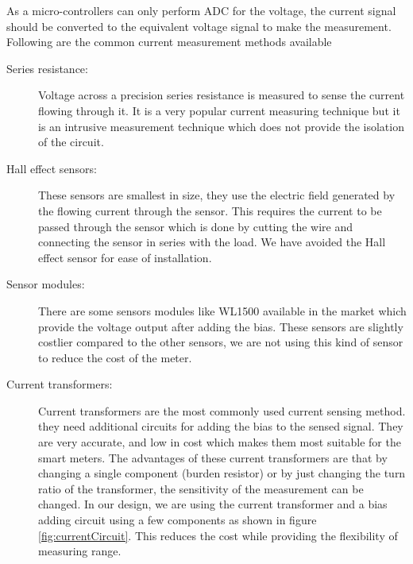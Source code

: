 As a micro-controllers can only perform ADC for the voltage, the current signal should be converted to the equivalent voltage signal to make the measurement. Following are the common current measurement methods available

\begin{description}
\item [Series resistance:] Voltage across a precision series resistance is measured to sense the current flowing through it. It is a very popular current measuring technique but it is an intrusive measurement technique which does not provide the isolation of the circuit.

\item [Hall effect sensors:] These sensors are smallest in size, they use the electric field generated by the flowing current through the sensor. This requires the current to be passed through the sensor which is done by cutting the wire and connecting the sensor in series with the load. We have avoided the Hall effect sensor for ease of installation.

\item [Sensor modules:] There are some sensors modules like WL1500 available in the market which provide the voltage output after adding the bias.  %
These sensors are slightly costlier compared to the other sensors, we are not using this kind of sensor to reduce the cost of the meter.

\item [Current transformers:] Current transformers are the most commonly used current sensing method. they need additional circuits for adding the bias to the sensed signal. They are very accurate, and low in cost which makes them most suitable for the smart meters. The advantages of these current transformers are that by changing a single component (burden resistor) or by just changing the turn ratio of the transformer, the sensitivity of the measurement can be changed.  In our design, we are using the current transformer and a bias adding circuit using a few components as shown in figure \ref{fig:currentCircuit}. This reduces the cost while providing the flexibility of measuring range.

\end{description}

